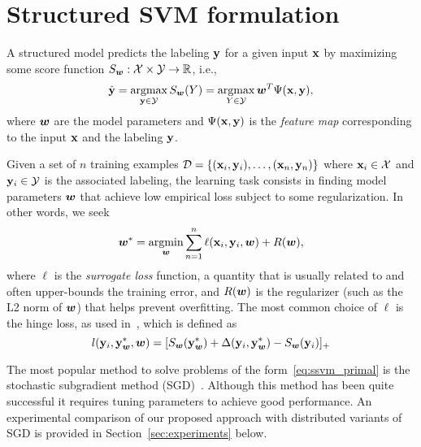\section{Structured SVM formulation}

A structured model predicts the labeling ${\bf y}$ for a given input ${\bf x}$ by maximizing some score function
$S_{\bm{w}}:\mathcal{X} \times \mathcal{Y} \rightarrow \mathbb{R}$,
i.e.,
%
\begin{equation}
\label{eq:inference}
\hat{\yv} = \argmax_{\yv \in \mathcal{Y}} S_\wv(Y) = \argmax_{Y \in \mathcal{Y}} \wv^T\Psi(\xv,\yv),
\end{equation}
%
where ${\bm{w}}$ are the model parameters and $\Psi({\bf x},{\bf y})$ is the \emph{feature map} corresponding to the input ${\bf x}$ and the labeling ${\bf y}$.


Given a set of $n$ training examples ${\cal D}=\{({\bf x}_i,{\bf y}_i), \dots, ({\bf x}_n, {\bf y}_n)\}$ where ${\bf x}_i \in \mathcal{X}$ and ${\bf y}_i \in \mathcal{Y}$ is the associated labeling, 
the learning task consists in finding model parameters ${\bm{w}}$ that achieve low empirical loss subject to some regularization. In other words, we seek
%
\begin{align}
\label{eq:ssvm_primal}
\wv^* = \argmin_{\wv} \sum_{n=1}^n \ell(\xv_i, \yv_i, \wv) + R(\wv),
\end{align}
%
where $\ell$ is the \emph{surrogate loss} function,
a quantity that is usually related to and often upper-bounds the training error, 
and $R({\bm{w}})$ is the regularizer (such as the L2 norm of ${\bm{w}}$)
that helps prevent overfitting. 
The most common choice of $\ell$ is the hinge loss, as used in~\citep{Taskar:2003tt,Tsochantaridis:2005ww}, which is defined as
\begin{equation}
\label{eq:hinge-loss}
l({\bf y}_i, {\bf y}^*_{\bm{w}}, {\bm{w}}) = [S_{\bm{w}}({\bf y}^*_{\bm{w}}) + \Delta({\bf y}_i, {\bf y}^*_{\bm{w}}) - S_{\bm{w}}({\bf y}_i)]_+
\end{equation}


The most popular method to solve problems of the form~\eqref{eq:ssvm_primal}
is the stochastic subgradient method (SGD)~\citep{Ratliff:2007ti,ShalevShwartz:2010cg}. Although this method has been quite successful it requires tuning parameters to achieve good performance. An experimental comparison of our proposed approach with distributed variants of SGD is provided in Section~\ref{sec:experiments} below.


